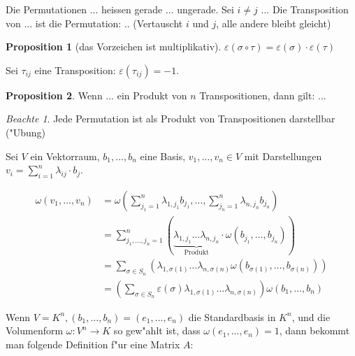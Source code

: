 \documentclass[11pt]{article}
\theoremstyle{remark}
\newtheorem*{notte}{Beachte}
\theoremstyle{definition}
\newtheorem*{proposition}{Proposition}
\theoremstyle{remark}
\begin{document}
\begin{definition}{}{}
  Die Permutationen ... heissen gerade ... ungerade.
  Sei $i\not=j$ ... Die Transposition von ... ist die Permutation: ..
  (Vertauscht $i$ und $j$, alle andere bleibt gleicht)
\end{definition}


\begin{proposition}[das Vorzeichen ist multiplikativ]
  $\varepsilon(\sigma\circ \tau)= \varepsilon (\sigma) \cdot \varepsilon (\tau)$
\end{proposition}


\begin{relation}
  Sei $\tau_{ij}$ eine Transposition: $\varepsilon(\tau_{ij})=-1$.
\end{relation}

\begin{proposition}
  Wenn ... ein Produkt von $n$ Transpositionen, dann gilt: ...
\end{proposition}

\begin{notte}
  Jede Permutation ist als Produkt von Transpositionen darstellbar ("Ubung)
\end{notte}


Sei \(V\) ein Vektorraum, \(b_1, ..., b_n\) eine Basis, \(v_1, ..., v_n \in
V\) mit Darstellungen \(v_i = \sum_{i=1}^n{\lambda_{ij}\cdot b_j}\).

\begin{align*}
    \omega(v_1,\dots,v_n) &= \omega\left(\sum_{j_1=1}^n\lambda_{1,j_1}b_{j_1},\dots,\sum_{j_n=1}^n\lambda_{n,j_n}b_{j_n}\right) \\
    &= \sum_{j_1,\dots,j_n=1}^n\left(\underbrace{\lambda_{1,j_1}\dots\lambda_{n,j_n}}_{\text{Produkt}}\cdot\omega(b_{j_1},\dots,b_{j_n})\right) \\
    &= \sum_{\sigma\in S_n}\left(\lambda_{1,\sigma(1)}\dots\lambda_{n,\sigma(n)}\omega(b_{\sigma(1)},\dots,b_{\sigma(n)})\right) \\
    &= \left(\sum_{\sigma\in S_n}{\varepsilon(\sigma)}\lambda_{1,\sigma(1)}\dots\lambda_{n,\sigma(n)}\right)\omega(b_1,\dots,b_n)
\end{align*}


 Wenn \(V=K^n, (b_1,\dots,b_n) = (e_1,\dots,e_n)\) die Standardbasis in \(K^n\), und die Volumenform \(\omega:
 V^n\to K\) so gew"ahlt ist, dass \(\omega(e_1,...,e_n)=1\), dann bekommt man
 folgende Definition f"ur eine Matrix \(A\):
\end{document}
